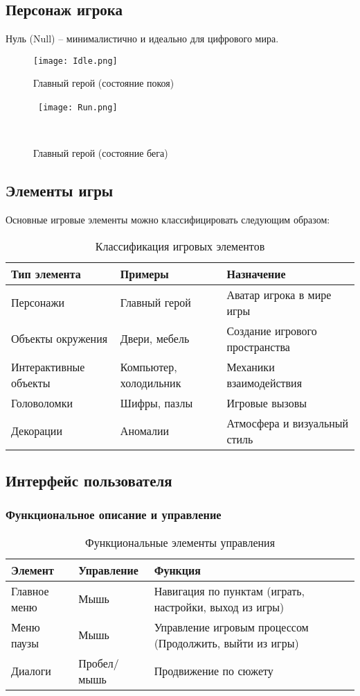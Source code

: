 \documentclass{article}
\begin{document}
\subsection{Персонаж игрока}
Нуль (Null) – минималистично и идеально для цифрового мира.
\begin{figure}[h] 
    \centering 
    \texttt{[image: Idle.png]}
    \caption{Главный герой (состояние покоя)} \
    \texttt{[image: Run.png]}
    \caption{Главный герой (состояние бега)} \
\end{figure}

\subsection{Элементы игры}
Основные игровые элементы можно классифицировать следующим образом:

\begin{table}[h]
\centering
\begin{tabular}{|l|l|l|}
\hline
\textbf{Тип элемента} & \textbf{Примеры} & \textbf{Назначение} \\ \hline
Персонажи & Главный герой & Аватар игрока в мире игры \\ \hline
Объекты окружения & Двери, мебель & Создание игрового пространства \\ \hline
Интерактивные объекты & Компьютер, холодильник & Механики взаимодействия \\ \hline
Головоломки & Шифры, пазлы & Игровые вызовы \\ \hline
Декорации & Аномалии & Атмосфера и визуальный стиль \\ \hline
\end{tabular}
\caption{Классификация игровых элементов}
\label{tab:game_elements}
\end{table}

\subsection{Интерфейс пользователя}

\subsubsection{Функциональное описание и управление}
\begin{table}[h]
\centering
\begin{tabular}{|l|l|l|}
\hline
\textbf{Элемент} & \textbf{Управление} & \textbf{Функция} \\ \hline
Главное меню & Мышь & Навигация по пунктам (играть, настройки, выход из игры) \\ \hline
Меню паузы & Мышь & Управление игровым процессом (Продолжить, выйти из игры) \\ \hline
Диалоги & Пробел/мышь & Продвижение по сюжету \\ \hline
\end{tabular}
\caption{Функциональные элементы управления}
\label{tab:ui_controls}
\end{table}
\end{document}

